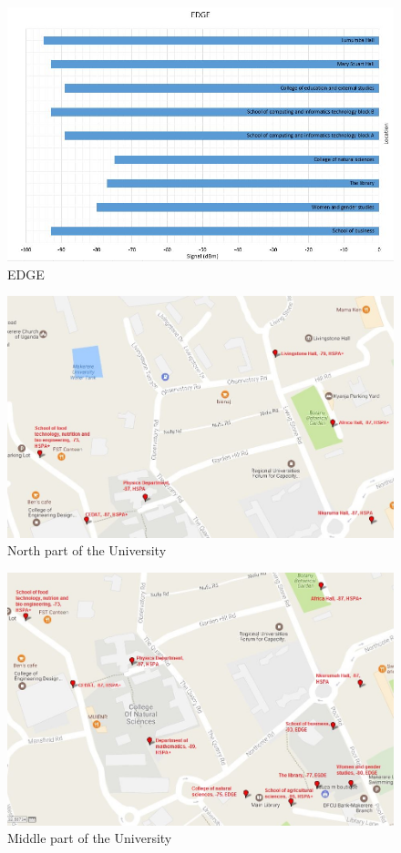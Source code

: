 \documentclass{article}
\begin{document}
\begin{figure}
  \includegraphics[width=\linewidth]{edge.jpg}
  \caption{EDGE}
  \label{fig:edge}
\end{figure}

\begin{figure}
  \includegraphics[width=\linewidth]{north.jpg}
  \caption{North part of the University}
  \label{fig:north}
\end{figure}

\begin{figure}
  \includegraphics[width=\linewidth]{middle.jpg}
  \caption{Middle part of the University}
  \label{fig:middle}
\end{figure}
\end{document}
